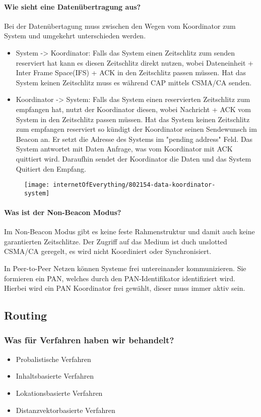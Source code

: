 	\paragraph{Wie sieht eine Datenübertragung aus?}
	Bei der Datenübertagung muss zwischen den Wegen vom Koordinator zum System und umgekehrt unterschieden werden.
	\begin{itemize}
		\item System -> Koordinator: Falls das System einen Zeitschlitz zum senden reserviert hat kann es diesen Zeitschlitz direkt nutzen, wobei Dateneinheit + Inter Frame Space(IFS) + ACK  in den Zeitschlitz passen müssen. Hat das System keinen Zeitschlitz muss es während CAP mittels CSMA/CA senden.
		
		\item Koordinator -> System: Falls das System einen reservierten Zeitschlitz zum empfangen hat, nutzt der Koordinator diesen, wobei Nachricht + ACK vom System in den Zeitschlitz passen müssen. Hat das System keinen Zeitschlitz zum empfangen reserviert so kündigt der Koordinator seinen Sendewunsch im Beacon an. Er setzt die Adresse des Systems im "pending address" Feld. Das System antwortet mit Daten Anfrage, was vom Koordinator mit ACK quittiert wird. Daraufhin sendet der Koordinator die Daten und das System Quitiert den Empfang.
	\end{itemize}
	\begin{figure}[H]
		\centering
		\texttt{[image: internetOfEverything/802154-data-koordinator-system]}	
	\end{figure}
	
	\paragraph{Was ist der Non-Beacon Modus?}
	Im Non-Beacon Modus gibt es keine feste Rahmenstruktur und damit auch keine garantierten Zeitschlitze. Der Zugriff auf das Medium ist duch unslotted CSMA/CA geregelt, es wird nicht Koordiniert oder Synchronisiert.
	 
	 In Peer-to-Peer Netzen können Systeme frei untereinander kommunizieren. Sie formieren ein PAN, welches durch den PAN-Identifikator identifiziert wird. Hierbei wird ein PAN Koordinator frei gewählt, dieser muss immer aktiv sein.

\subsection{Routing}
\subsubsection{Was für Verfahren haben wir behandelt?}
\begin{itemize}
	\item Probalistische Verfahren
	\item Inhaltsbasierte Verfahren
	\item Lokationsbasierte Verfahren
	\item Distanzvektorbasierte Verfahren
\end{itemize}
